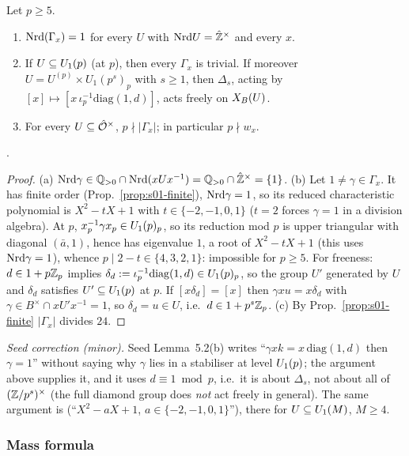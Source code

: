 \begin{lemma}\label{lem:s01-stab}
Let $p\ge5$.
\begin{enumerate}[label=(\alph*)]
\item $\mathrm{Nrd}(\Gamma_x)=1$ for every $U$ with $\mathrm{Nrd} U=\hat{\mathbb{Z}}^\times$ and every $x$.
\item If $U\subseteq U_1(p)$ (at $p$), then every $\Gamma_x$ is trivial. If moreover $U=U^{(p)}\times U_{1}(p^s)_p$ with $s\ge1$,
  then $\Delta_s$, acting by $[x]\mapsto[x\,\iota_p^{-1}\mathrm{diag}(1,d)]$, acts freely on $X_B(U)$.
\item For every $U\subseteq\hat{\mathcal{O}}^\times$, $p\nmid|\Gamma_x|$; in particular $p\nmid w_x$.
\end{enumerate}
\stproved.
\end{lemma}
\begin{proof}
(a) $\mathrm{Nrd}\gamma\in\mathbb{Q}_{>0}\cap\mathrm{Nrd}(xUx^{-1})=\mathbb{Q}_{>0}\cap\hat{\mathbb{Z}}^\times=\{1\}$.
(b) Let $1\ne\gamma\in\Gamma_x$. It has finite order (Prop.~\ref{prop:s01-finite}), $\mathrm{Nrd}\gamma=1$, so its reduced
characteristic polynomial is $X^2-tX+1$ with $t\in\{-2,-1,0,1\}$ ($t=2$ forces $\gamma=1$ in a division algebra).
At $p$, $x_p^{-1}\gamma x_p\in U_1(p)_p$, so its reduction mod $p$ is upper triangular with diagonal $(\bar a,1)$, hence has eigenvalue $1$, a root of $X^2-tX+1$
(this uses $\mathrm{Nrd}\gamma=1$), whence $p\mid 2-t\in\{4,3,2,1\}$:
impossible for $p\ge5$. For freeness: $d\in1+p\mathbb{Z}_p$ implies $\delta_d:=\iota_p^{-1}\mathrm{diag}(1,d)\in U_1(p)_p$, so the group
$U'$ generated by $U$ and $\delta_d$ satisfies $U'\subseteq U_1(p)$ at $p$. If $[x\delta_d]=[x]$ then $\gamma x u=x\delta_d$ with
$\gamma\in B^\times\cap xU'x^{-1}=1$, so $\delta_d=u\in U$, i.e.\ $d\in1+p^s\mathbb{Z}_p$.
(c) By Prop.~\ref{prop:s01-finite} $|\Gamma_x|$ divides $24$.
\end{proof}
\noindent\emph{Seed correction (minor).} Seed Lemma~5.2(b) writes ``$\gamma xk=x\,\mathrm{diag}(1,d)$ then $\gamma=1$''
without saying why $\gamma$ lies in a stabiliser at level $U_1(p)$; the argument above supplies it, and it uses $d\equiv1\bmod p$,
i.e.\ it is about $\Delta_s$, not about all of $(\mathbb{Z}/p^s)^\times$ (the full diamond group does \emph{not} act freely in
general). The same argument is 
(``$X^2-aX+1$, $a\in\{-2,-1,0,1\}$''), there for $U\subseteq U_1(M)$, $M\ge4$.

\subsubsection{Mass formula}

